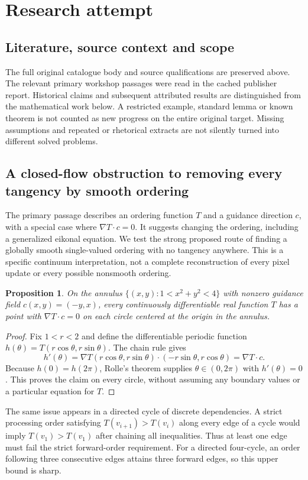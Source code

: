 \documentclass[11pt]{article}
\newtheorem{proposition}{Proposition}
\begin{document}
\section{Research attempt}
\subsection{Literature, source context and scope}
The full original catalogue body and source qualifications are preserved above. The relevant primary workshop passages were read in the cached publisher report. Historical claims and subsequent attributed results are distinguished from the mathematical work below. A restricted example, standard lemma or known theorem is not counted as new progress on the entire original target. Missing assumptions and repeated or rhetorical extracts are not silently turned into different solved problems.

\subsection{A closed-flow obstruction to removing every tangency by smooth ordering}
The primary passage describes an ordering function $T$ and a guidance direction $c$, with a special case where $\nabla T\cdot c=0$. It suggests changing the ordering, including a generalized eikonal equation. We test the strong proposed route of finding a globally smooth single-valued ordering with no tangency anywhere. This is a specific continuum interpretation, not a complete reconstruction of every pixel update or every possible nonsmooth ordering.
\begin{proposition}
On the annulus $\{(x,y):1<x^2+y^2<4\}$ with nonzero guidance field $c(x,y)=(-y,x)$, every continuously differentiable real function $T$ has a point with $\nabla T\cdot c=0$ on each circle centered at the origin in the annulus.
\end{proposition}
\begin{proof}
Fix $1<r<2$ and define the differentiable periodic function $h(\theta)=T(r\cos\theta,r\sin\theta)$. The chain rule gives
\[
h'(\theta)=\nabla T(r\cos\theta,r\sin\theta)\cdot(-r\sin\theta,r\cos\theta)=\nabla T\cdot c.
\]
Because $h(0)=h(2\pi)$, Rolle's theorem supplies $\theta\in(0,2\pi)$ with $h'(\theta)=0$. This proves the claim on every circle, without assuming any boundary values or a particular equation for $T$.
\end{proof}
The same issue appears in a directed cycle of discrete dependencies. A strict processing order satisfying $T(v_{i+1})>T(v_i)$ along every edge of a cycle would imply $T(v_1)>T(v_1)$ after chaining all inequalities. Thus at least one edge must fail the strict forward-order requirement. For a directed four-cycle, an order following three consecutive edges attains three forward edges, so this upper bound is sharp.
\end{document}
